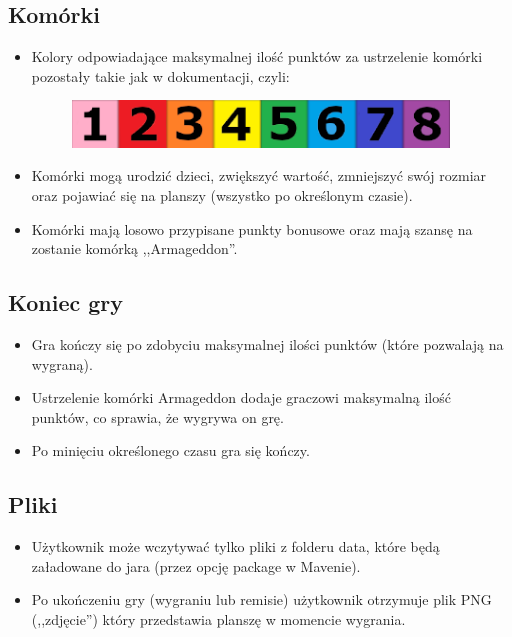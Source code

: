 \documentclass{article}
\begin{document}
\subsection{Komórki}
\begin{itemize}
    \item Kolory odpowiadające maksymalnej ilość punktów za ustrzelenie komórki pozostały takie jak w dokumentacji, czyli: 
    
        \begin{figure} [hbt!]
            \includegraphics[width=10cm,center]{images/pointsAndColors.png}
        \end{figure}

    \item Komórki mogą urodzić dzieci, zwiększyć wartość, zmniejszyć swój rozmiar oraz pojawiać się na planszy (wszystko po określonym czasie).
    \item Komórki mają losowo przypisane punkty bonusowe oraz mają szansę na zostanie komórką ,,Armageddon''.
\end{itemize}

\subsection{Koniec gry}
\begin{itemize}
    \item Gra kończy się po zdobyciu maksymalnej ilości punktów (które pozwalają na wygraną).
    \item Ustrzelenie komórki Armageddon dodaje graczowi maksymalną ilość punktów, co sprawia, że wygrywa on grę.
    \item Po minięciu określonego czasu gra się kończy.
\end{itemize}

\subsection{Pliki}
\begin{itemize}
    \item Użytkownik może wczytywać tylko pliki z folderu data, które będą załadowane do jara (przez opcję package w Mavenie).
    \item Po ukończeniu gry (wygraniu lub remisie) użytkownik otrzymuje plik PNG (,,zdjęcie'') który przedstawia planszę w momencie wygrania.
\end{itemize}
\end{document}
